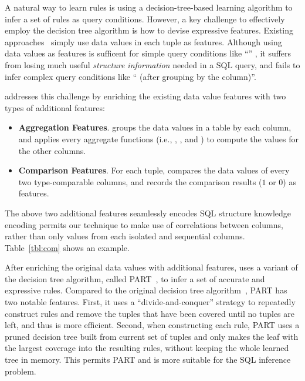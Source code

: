 A natural way to learn rules is using a decision-tree-based
learning algorithm to infer a set of rules as query conditions. However,
a key challenge to effectively employ the decision tree algorithm is how to devise
expressive features. Existing approaches~\cite{Tran:2009} simply use
data values in each tuple as features. Although using data values as
features is sufficent for simple query conditions like
``'' , it suffers from losing much useful \textit{structure information}
needed in a SQL query, and fails to infer complex query conditions
like `` (after grouping by
the  column)''.


\ourtool addresses this challenge by enriching the existing data value features with
two types of additional features:

\begin{itemize}

\item {\textbf{Aggregation Features}}. \ourtool groups the data values
in a table by each column, and applies every aggregate functions (i.e.,
, ,  and )
to compute the values for the other columns. 
 


\item {\textbf{Comparison Features}}. For each tuple, \ourtool compares
the data values of every two type-comparable columns, and records
the comparison results ($1$ or $0$) as features.


\end{itemize}

The above two additional features seamlessly encodes SQL
structure
 knowledge encoding permits our technique
to make use of correlations between columns, rather than only values
from each isolated and sequential columns.
Table~\ref{tbl:com} shows an example.


After enriching the original data values with additional features, 
\ourtool uses a variant of the decision tree algorithm, called PART~\cite{Frank:1998},
to infer a set of accurate and expressive rules.
Compared to the original decision tree algorithm~\cite{},
PART has two notable features. 
First, it uses a ``divide-and-conquer'' strategy to repeatedly
construct rules and remove the tuples that have been covered until no tuples are left,
and thus is more efficient.
Second, when constructing each rule, PART uses a pruned decision tree built from
current set of tuples and only makes the leaf with the largest coverage
into the resulting rules, without keeping the whole learned tree in memory.
This permits PART  and is more suitable
for the SQL inference problem.



